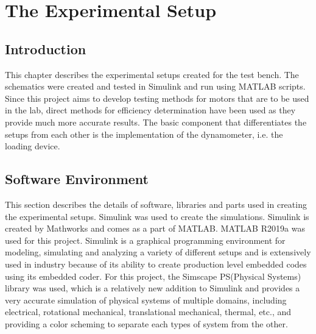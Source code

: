\chapter{The Experimental Setup} %
\label{Chapter3}

\section{Introduction}

This chapter describes the experimental setups created for the test bench. The schematics were created and tested in Simulink and run using MATLAB scripts. Since this project aims to develop testing methods for motors that are to be used in the lab, direct methods for efficiency determination have been used as they provide much more accurate results. The basic component that differentiates the setups from each other is the implementation of the dynamometer, i.e. the loading device. 

\section{Software Environment}
This section describes the details of software, libraries and parts used in creating the experimental setups. Simulink was used to create the simulations. Simulink is created by Mathworks and comes as a part of MATLAB. MATLAB R2019a was used for this project. Simulink is a graphical programming environment for modeling, simulating and analyzing a variety of different setups and is extensively used in industry because of its ability to create production level embedded codes using its embedded coder. For this project, the Simscape PS(Physical Systems)\cite{shao2017model} library was used, which is a relatively new addition to Simulink and provides a very accurate simulation of physical systems\cite{rai2016generalized} of multiple domains, including electrical, rotational mechanical, translational mechanical, thermal, etc., and providing a color scheming to separate each types of system from the other. 

